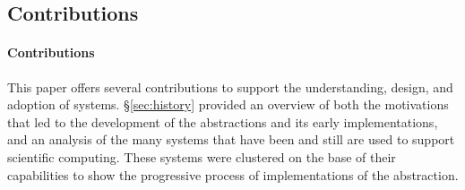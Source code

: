 \documentclass{sig-alternate}
\begin{document}


%
\subsection{Contributions}
\label{sec:contributions}

\paragraph*{Contributions} 

This paper offers several contributions to support the understanding, design,
and adoption of \pilot systems. \S\ref{sec:history} provided an overview of both
the motivations that led to the development of the \pilot abstractions and its
early implementations, and an analysis of the many \pilot systems that have been
and still are used to support scientific computing. These systems were clustered
on the base of their capabilities to show the progressive process of
implementations of the \pilot abstraction.
\end{document}
